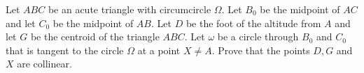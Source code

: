 Let 
$ABC$
 be an acute triangle with circumcircle 
$\Omega$.
 Let 
$B_0$
 be the midpoint of 
$AC$
 and let 
$C_0$
 be the midpoint of 
$AB$.
 Let 
$D$
 be the foot of the altitude from 
$A$
 and let 
$G$
 be the centroid of the triangle 
$ABC$.
 Let 
$\omega$
 be a circle through 
$B_0$
 and 
$C_0$
 that is tangent to the circle 
$\Omega$
 at a point 
$X\not= A$.
 Prove that the points 
$D,G$
 and 
$X$
 are collinear.
